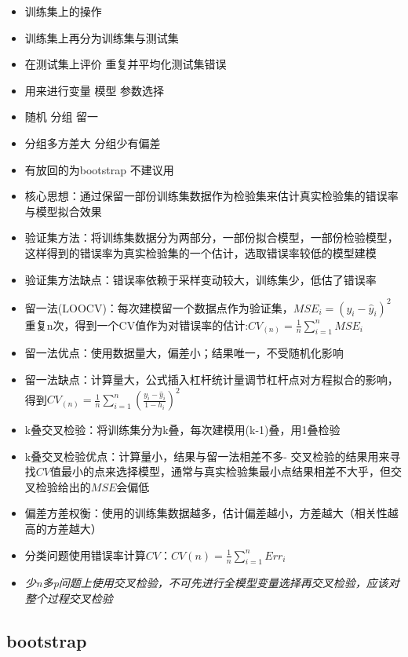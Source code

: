 \documentclass[]{book}
\begin{document}
\begin{itemize}
\item
  训练集上的操作
\item
  训练集上再分为训练集与测试集
\item
  在测试集上评价 重复并平均化测试集错误
\item
  用来进行变量 模型 参数选择
\item
  随机 分组 留一
\item
  分组多方差大 分组少有偏差
\item
  有放回的为bootstrap 不建议用
\item
  核心思想：通过保留一部份训练集数据作为检验集来估计真实检验集的错误率与模型拟合效果
\item
  验证集方法：将训练集数据分为两部分，一部份拟合模型，一部份检验模型，这样得到的错误率为真实检验集的一个估计，选取错误率较低的模型建模
\item
  验证集方法缺点：错误率依赖于采样变动较大，训练集少，低估了错误率
\item
  留一法(LOOCV)：每次建模留一个数据点作为验证集，\(MSE_i = (y_i - \hat y_i)^2\)重复n次，得到一个CV值作为对错误率的估计:\(CV_{(n)} = \frac{1}{n} \sum_{i = 1}^{n} MSE_i\)
\item
  留一法优点：使用数据量大，偏差小；结果唯一，不受随机化影响
\item
  留一法缺点：计算量大，公式插入杠杆统计量调节杠杆点对方程拟合的影响，得到\(CV_{(n)} = \frac{1}{n} \sum_{i = 1}^{n} (\frac{y_i - \hat y_i}{1 - h_i})^2\)
\item
  k叠交叉检验：将训练集分为k叠，每次建模用(k-1)叠，用1叠检验
\item
  k叠交叉检验优点：计算量小，结果与留一法相差不多- 交叉检验的结果用来寻找\(CV\)值最小的点来选择模型，通常与真实检验集最小点结果相差不大乎，但交叉检验给出的\(MSE\)会偏低
\item
  偏差方差权衡：使用的训练集数据越多，估计偏差越小，方差越大（相关性越高的方差越大）
\item
  分类问题使用错误率计算\(CV\)：\(CV{(n)} = \frac{1}{n} \sum_{i = 1}^{n} Err_{i}\)
\item
  \emph{少n多p问题上使用交叉检验，不可先进行全模型变量选择再交叉检验，应该对整个过程交叉检验}
\end{itemize}

\hypertarget{bootstrap}{%
\subsection{bootstrap}\label{bootstrap}}
\end{document}
